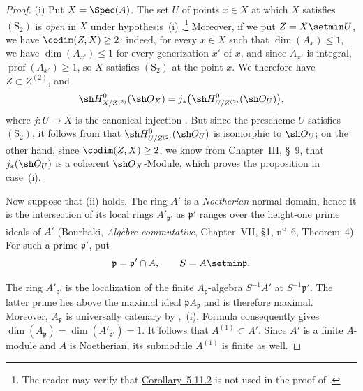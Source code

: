 \begin{proof}
{\rm(i)} Put $X=\Spec(A)$.  The set $U$ of points $x\in X$ at which
$X$ satisfies $(\mathrm S_2)$ is \emph{open} in $X$ under
hypothesis~{\rm(i)} .\footnote{The reader may verify that
{\hyperref[IV.5.11.2]{Corollary~5.11.2}} is not used in the proof of
.}
Moreover, if we put $Z=X\setmin U$, we have $\codim(Z,X)\geq2$: indeed,
for every $x\in X$ such that $\dim(A_x)\leq1$, we have
$\dim(A_{x'})\leq1$ for every generization $x'$ of $x$, and since
$A_{x'}$ is integral, $\operatorname{prof}(A_{x'})\geq1$, so $X$
satisfies $(\mathrm S_2)$ at the point $x$.  We therefore have
$Z\subset Z^{(2)}$, and
\[
  \sh H^0_{X/Z^{(2)}}(\sh O_X)
  =
  j_*\bigl(
    \sh H^0_{U/Z^{(2)}}(\sh O_U)
  \bigr),
\]
where $j:U\to X$ is the canonical injection .  But
since the prescheme $U$ satisfies $(\mathrm S_2)$, it follows from
 that $\sh H^0_{U/Z^{(2)}}(\sh O_U)$ is isomorphic to
$\sh O_U$; on the other hand, since $\codim(Z,X)\geq2$, we know from
Chapter~III, \S~9, that $j_*(\sh O_U)$ is a coherent $\sh O_X$-Module,
which proves the proposition in case~{\rm(i)}.

Now suppose that {\rm(ii)} holds.  The ring $A'$ is a \emph{Noetherian}
normal domain, hence it is the intersection of its local rings
$A'_{\mathfrak p'}$ as $\mathfrak p'$ ranges over the
height-one prime ideals of $A'$
(Bourbaki, \emph{Alg\`ebre commutative}, Chapter~VII,
\S1, n\textsuperscript{o}~6, Theorem~4).  For such a prime $\mathfrak p'$, put
\[
  \mathfrak p=\mathfrak p'\cap A,
  \qquad
  S=A\setmin\mathfrak p.
\]


The ring $A'_{\mathfrak p'}$ is the localization of the finite
$A_{\mathfrak p}$-algebra $S^{-1}A'$ at
$S^{-1}\mathfrak p'$.  The latter prime lies above the maximal
ideal $\mathfrak pA_{\mathfrak p}$ and is therefore maximal.
Moreover, $A_{\mathfrak p}$ is universally catenary by
,~(i).  Formula  consequently gives $\dim(A_{\mathfrak p})
=\dim(A'_{\mathfrak p'})
=1$.
It follows that $A^{(1)}\subset A'$.  Since $A'$ is a finite
$A$-module and $A$ is Noetherian, its submodule $A^{(1)}$ is
finite as well.
\end{proof}
